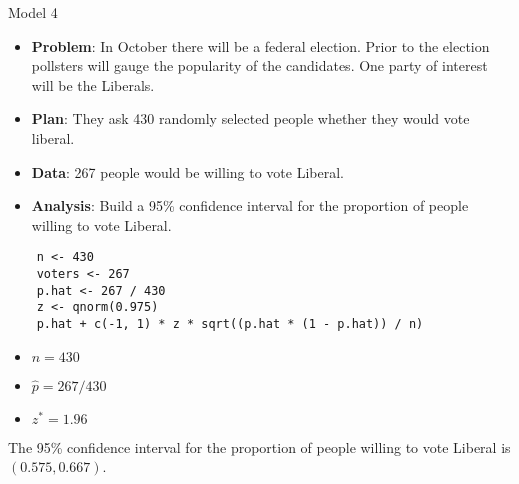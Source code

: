 \begin{Example}{Model 4}{}
    \begin{itemize}
        \item \textbf{Problem}: In October there will be a federal election. Prior to the election pollsters will gauge the popularity of the
              candidates. One party of interest will be the Liberals.
        \item \textbf{Plan}: They ask 430 randomly selected people whether they would vote liberal.
        \item \textbf{Data}: 267 people would be willing to vote Liberal.
        \item \textbf{Analysis}: Build a 95\% confidence interval for the proportion of people willing to vote Liberal.
    \end{itemize}
    \begin{verbatim}
    n <- 430
    voters <- 267
    p.hat <- 267 / 430
    z <- qnorm(0.975)
    p.hat + c(-1, 1) * z * sqrt((p.hat * (1 - p.hat)) / n)
    \end{verbatim}
    \begin{itemize}
        \item $ n=430 $
        \item $ \hat{p}=267/430 $
        \item $ z^*=1.96 $
    \end{itemize}
    The 95\% confidence interval for the proportion of people willing to vote Liberal
    is $ (0.575, 0.667) $.
\end{Example}

